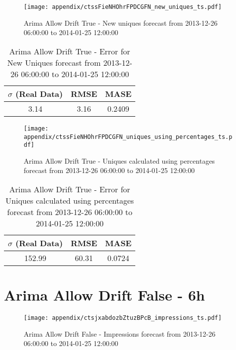 \begin{figure}[H] \begin{center} \leavevmode
\texttt{[image: appendix/ctssFieNHOhrFPDCGFN\_new\_uniques\_ts.pdf]} \caption{
Arima Allow Drift True - New uniques forecast from 2013-12-26 06:00:00 to 2014-01-25 12:00:00} \label{fig:appendix/ctssFieNHOhrFPDCGFN_new_uniques_ts.pdf} \end{center}
\end{figure}

\begin{table}[H]
\centering
\footnotesize
\begin{tabular}{ccc}
$\sigma$ (Real Data) & RMSE & MASE   \\ \hline
3.14 & 3.16 & 0.2409 \\
\end{tabular}

\vspace{0.5cm}

\caption{
Arima Allow Drift True - Error for New Uniques forecast from 2013-12-26 06:00:00 to 2014-01-25 12:00:00}
\end{table}

\begin{figure}[H] \begin{center} \leavevmode
\texttt{[image: appendix/ctssFieNHOhrFPDCGFN\_uniques\_using\_percentages\_ts.pdf]} \caption{
Arima Allow Drift True - Uniques calculated using percentages forecast from 2013-12-26 06:00:00 to 2014-01-25 12:00:00} \label{fig:appendix/ctssFieNHOhrFPDCGFN_uniques_using_percentages_ts.pdf} \end{center}
\end{figure}

\begin{table}[H]
\centering
\footnotesize
\begin{tabular}{ccc}
$\sigma$ (Real Data) & RMSE & MASE   \\ \hline
152.99 & 60.31 & 0.0724 \\
\end{tabular}

\vspace{0.5cm}

\caption{
Arima Allow Drift True - Error for Uniques calculated using percentages forecast from 2013-12-26 06:00:00 to 2014-01-25 12:00:00}
\end{table}

\section{Arima Allow Drift False - 6h}
\begin{figure}[H] \begin{center} \leavevmode
\texttt{[image: appendix/ctsjxabdozbZtuzBPcB\_impressions\_ts.pdf]} \caption{
Arima Allow Drift False - Impressions forecast from 2013-12-26 06:00:00 to 2014-01-25 12:00:00} \label{fig:appendix/ctsjxabdozbZtuzBPcB_impressions_ts.pdf} \end{center}
\end{figure}

